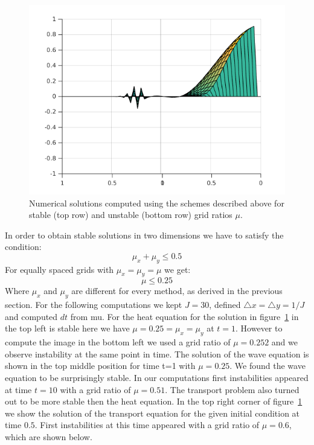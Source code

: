 \begin{figure}
\includegraphics[scale = 0.33]{images/transportUnstable.png}
\caption{Numerical solutions computed using the schemes described above for stable (top row) and unstable (bottom row) grid ratios $\mu$.}
\label{fig:stableUnstable}
\end{figure}
In order to obtain stable solutions in two dimensions we have to satisfy the condition:
\begin{equation}
\mu_x + \mu_y \leq 0.5
\end{equation}
For equally spaced grids with $\mu_x = \mu_y = \mu$ we get:
\begin{equation}
\mu \leq 0.25
\end{equation}
Where $\mu_x$ and $\mu_y$ are different for every method, as derived in the previous section. For the following computations we kept $J=30$, defined $\triangle x = \triangle y = 1/J$ and computed $dt$ from mu. For the heat equation for the solution in figure~\ref{fig:stableUnstable} in the top left is stable here we have $\mu = 0.25 = \mu_x = \mu_y$ at $t=1$. However to compute the image in the bottom left we used a grid ratio of $\mu = 0.252$ and we observe instability at the same point in time. The solution of the wave equation is shown in the top middle position for time t=1 with $\mu = 0.25$. We found the wave equation to be surprisingly stable. In our computations first instabilities appeared at time $t = 10$ with a grid ratio of $\mu = 0.51$. The transport problem also turned out to be more stable then the heat equation. In the top right corner of figure~\ref{fig:stableUnstable} we show the solution of the transport equation for the given initial condition at time $0.5$. First instabilities at this time appeared with a grid ratio of $\mu = 0.6$, which are shown below.



